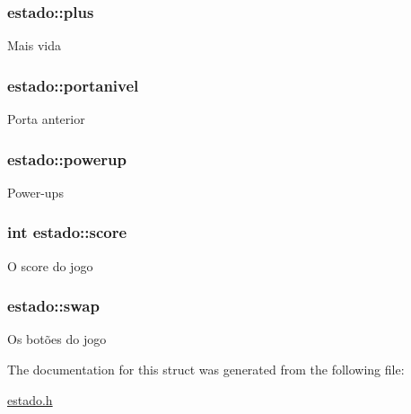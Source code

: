 \subsubsection[{\texorpdfstring{plus}{plus}}]{ estado\+::plus}\hypertarget{structestado_abce94d44e3c723ada8348def234264be}{}\label{structestado_abce94d44e3c723ada8348def234264be}
Mais vida 
\subsubsection[{\texorpdfstring{portanivel}{portanivel}}]{ estado\+::portanivel}\hypertarget{structestado_a3c4dc3d28aa17dfdc5048150396e4bdc}{}\label{structestado_a3c4dc3d28aa17dfdc5048150396e4bdc}
Porta anterior 
\subsubsection[{\texorpdfstring{powerup}{powerup}}]{ estado\+::powerup}\hypertarget{structestado_a1128015f9f1ad3bc4b63ec8c9e94b48b}{}\label{structestado_a1128015f9f1ad3bc4b63ec8c9e94b48b}
Power-\/ups 
\subsubsection[{\texorpdfstring{score}{score}}]{\setlength{\rightskip}{0pt plus 5cm}int estado\+::score}\hypertarget{structestado_a47e99ef4241dfe72d9d68244a68adb46}{}\label{structestado_a47e99ef4241dfe72d9d68244a68adb46}
O score do jogo 
\subsubsection[{\texorpdfstring{swap}{swap}}]{ estado\+::swap}\hypertarget{structestado_a5f7b606e7ce960d06118ff5916a84f84}{}\label{structestado_a5f7b606e7ce960d06118ff5916a84f84}
Os botões do jogo 

The documentation for this struct was generated from the following file\+:\begin{DoxyCompactItemize}
\item 
\hyperlink{estado_8h}{estado.\+h}\end{DoxyCompactItemize}
